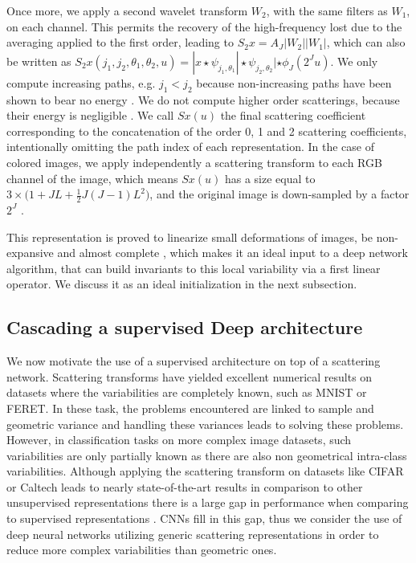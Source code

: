 \documentclass[10pt,twocolumn,letterpaper]{article}
\newcommand{\citep}{\cite}
\begin{document}
Once more, we apply a second wavelet transform $W_2$, with the same filters as $W_1$, on each channel. This permits the recovery of the high-frequency lost due to the averaging applied to the first order, leading to $S_2x=A_J|W_2||W_1|$, which can also be written as $S_2x(j_1,j_2,\theta_1,\theta_2,u)=|x\star \psi_{j_1,\theta_1}|\star \psi_{j_2,\theta_2}|\star \phi_J(2^Ju)$. We only compute increasing paths, e.g. $j_1< j_2$ because non-increasing paths have been shown to bear no energy \citep{bruna2013invariant}. We do not compute higher order scatterings, because their energy is negligible \citep{bruna2013invariant}. We call $Sx(u)$ the final scattering coefficient corresponding to the concatenation of the order 0, 1 and 2 scattering coefficients, intentionally omitting the path index of each representation. In the case of colored images, we apply independently a scattering transform to each RGB channel of the image, which means  $Sx(u)$ has a size equal to $3\times \big(1+JL+\frac 1 2 J(J-1)L^2\big)$, and the original image is down-sampled by a factor $2^J$ \cite{bruna2013invariant}.

This representation is proved to linearize small deformations \cite{mallat2012group} of images, be non-expansive and almost complete \cite{dokmanic2016inverse,bruna2013audio}, which makes it an ideal input to a deep network algorithm, that can build invariants to this local variability via a first linear operator. We discuss it as an ideal initialization in the next subsection.  

\subsection{Cascading a supervised Deep architecture}
We now motivate the use of a supervised architecture on top of a scattering network. 
Scattering transforms have yielded excellent numerical results \cite{bruna2013invariant} on datasets where the variabilities are completely known, such as MNIST or FERET. In these task, the problems encountered are linked to sample and geometric variance and handling these variances leads to solving these problems. However, in classification tasks on more complex image datasets, such variabilities are only partially known as there are also non geometrical intra-class variabilities. Although applying the scattering transform on datasets like CIFAR or Caltech leads to nearly state-of-the-art results in comparison to other unsupervised representations there is a large gap in performance when comparing to supervised representations \cite{oyallon2015deep}. CNNs fill in this gap, thus we consider the use of deep neural networks utilizing generic scattering representations in order to reduce more complex variabilities than geometric ones.
\end{document}
